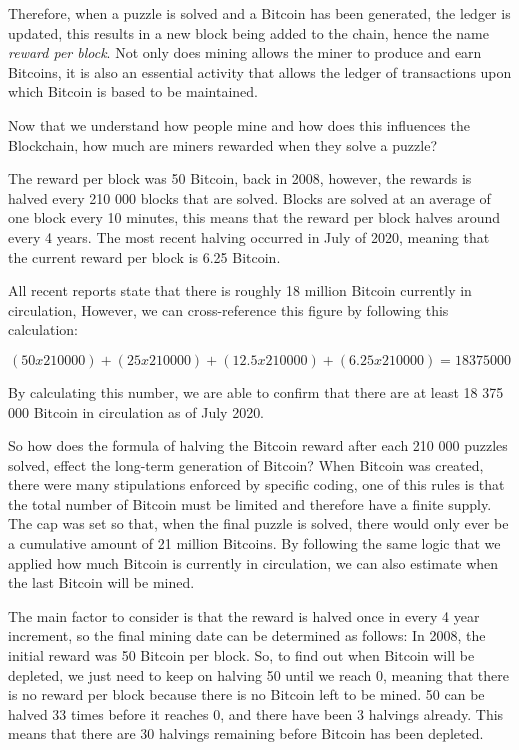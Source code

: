 \documentclass{article}
\begin{document}
Therefore, when a puzzle is solved and a Bitcoin has been generated, the ledger is updated, this results in a new block being added to the chain, hence the name \textit{reward per block}. Not only does mining allows the miner to produce and earn Bitcoins, it is also an essential activity that allows the ledger of transactions upon which Bitcoin is based to be maintained.

Now that we understand how people mine and how does this influences the Blockchain, how much are miners rewarded when they solve a puzzle?

The reward per block was 50 Bitcoin, back in 2008, however, the rewards is halved every 210 000 blocks that are solved. Blocks are solved at an average of one block every 10 minutes, this means that the reward per block halves around every 4 years. The most recent halving occurred in July of 2020, meaning that the current reward per block is 6.25 Bitcoin.

All recent reports state that there is roughly 18 million Bitcoin currently in circulation, However, we can cross-reference this figure by following this calculation:

\[(50 x 210 000) + (25 x 210 000) + (12.5 x 210 000) + (6.25 x 210 000) = 18 375 000\]

By calculating this number, we are able to confirm that there are at least 18 375 000 Bitcoin in circulation as of July 2020.

So how does the formula of halving the Bitcoin reward after each 210 000 puzzles solved, effect the long-term generation of Bitcoin?
When Bitcoin was created, there were many stipulations enforced by specific coding, one of this rules is that the total number of Bitcoin must be limited and therefore have a finite supply. The cap was set so that, when the final puzzle is solved, there would only ever be a cumulative amount of 21 million Bitcoins. By following the same logic that we applied how much Bitcoin is currently in circulation, we can also estimate when the last Bitcoin will be mined.

The main factor to consider is that the reward is halved once in every 4 year increment, so the final mining date can be determined as follows: In 2008, the initial reward was 50 Bitcoin per block. So, to find out when Bitcoin will be depleted, we just need to keep on halving 50 until we reach 0, meaning that there is no reward per block because there is no Bitcoin left to be mined. 50 can be halved 33 times before it reaches 0, and there have been 3 halvings already. This means that there are 30 halvings remaining before Bitcoin has been depleted.
\end{document}

